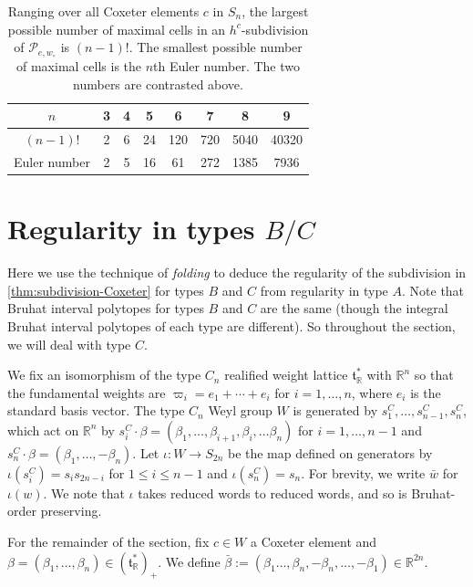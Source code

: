 \documentclass[11pt]{amsart}
\theoremstyle{definition}
\newcommand{\RR}{\mathbb{R}}
\newcommand{\bip}[1]{\mathcal{P}_{#1}}
\def\wo{w_\circ}
\def\hgt{h}
\def\hc{\hgt^c}
\def\pt{\beta}
\def\BB{{(\lie{t}_\RR^*)_+}}
\newcommand\lie[1]{{\mathfrak #1}}
\begin{document}
\begin{table}[h]
	\centering
	\begin{tabular}{c|c|c|c|c|c|c|c|}
		$n$ & 3 & 4 & 5 & 6 & 7 & 8 & 9\\
		\hline
		$(n-1)!$ & 2 & 6 & 24 & 120 & 720 & 5040 & 40320\\
		\hline
		Euler number & 2 & 5 & 16 & 61 & 272 & 1385 & 7936 \\
		\hline
	\end{tabular}
	\caption{Ranging over all Coxeter elements $c$ in $S_n$, the largest possible number of maximal cells in an $\hc$-subdivision of $\bip{e, \wo}$ is $(n-1)!$. The smallest possible number of maximal cells is the $n$th Euler number. The two numbers are contrasted above.}
	\label{tab:Euler-vs-factorial}
\end{table}




\section{Regularity in types $B/C$}\label{sec:regularity-BC}

Here we use the technique of \emph{folding} \cite{Stembridge} to deduce the regularity of the subdivision in \cref{thm:subdivision-Coxeter} for types $B$ and $C$ from regularity in type $A$. Note that Bruhat interval polytopes for types $B$ and $C$ are the same (though the integral Bruhat interval polytopes of each type are different). So throughout the section, we will deal with type $C$.

We fix an isomorphism of the type $C_n$ realified weight lattice
$\mathfrak{t}_{\RR}^*$ with $\RR^n$ so that the fundamental weights
are $ \varpi_i=e_1 + \cdots +e_i$ for $i=1, \dots, n$, where $e_i$ is
the standard basis vector. The type $C_n$ Weyl group $W$ is generated
by $s^C_1,\ldots, s^C_{n-1}, s^C_n$, which act on $\RR^n$ by
$s_i^C \cdot \pt = (\pt_1, \dots, \pt_{i+1}, \pt_i, \dots \pt_n)$ for
$i=1, \dots, n-1$ and $s_n^C \cdot \pt=(\pt_1, \dots, -\pt_n)$. Let
$\iota: W \to S_{2n}$ be the map defined on generators by
$\iota(s_i^{C}) = s_is_{2n-i}$ for $1 \leq i \leq n-1$ and
$\iota(s^C_n) = s_{n}$. For brevity, we write $\bar{w}$ for
$\iota(w)$. We note that $\iota$ takes reduced words to reduced words,
and so is Bruhat-order preserving.


For the remainder of the section, fix $c \in W$ a Coxeter element and $\pt =(\pt_1, \dots, \pt_n) \in \BB$. We define $\bar{\pt}:=(\pt_1 \dots, \pt_n, -\pt_n, \dots, -\pt_1) \in \RR^{2n}$. 
\end{document}
